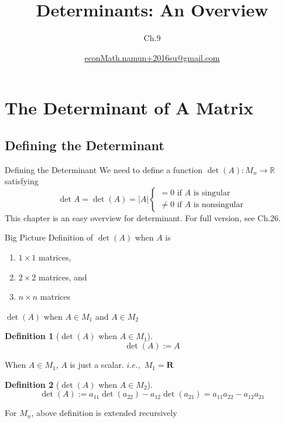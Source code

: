 \documentclass[final]{beamer}
\author[조남운]{\url{econMath.namun+2016su@gmail.com}}
\title{Determinants: An Overview}
\subtitle{Ch.9}
\newtheorem{defn}{Definition}
\begin{document}
	
\maketitle


\section{The Determinant of A Matrix} %
\label{sec:the_determinant_of_a_matrix}
\subsection{Defining the Determinant} %
\label{sub:defining_the_determinant}
\begin{frame}[t]{Defining the Determinant}
	We need to define a function $\det(A): M_n \rightarrow \mathbb{R}$ satisfying
	\[
		\det A = \det(A) = \vert A\vert \begin{cases}
			= 0 \text{ if $A$ is singular}\\
			\neq 0 \text{ if $A$ is nonsingular}
		\end{cases}
	\]
	This chapter is an easy overview for determinant. For full version, see Ch.26.
	\begin{block}
		{Big Picture}
		Definition of $\det(A)$ when $A$ is 
		\begin{enumerate}
			\item $1\times 1$ matrices,
			\item $2\times 2$ matrices, and
			\item $n\times n$ matrices
		\end{enumerate}
	\end{block}
\end{frame}
\begin{frame}[t]{$\det(A)$ when $A\in M_1$ and $A\in M_2$}
	\begin{defn}
		[$\det(A)$ when $A\in M_1$]
		\[
			\det(A):=A
		\]
	\end{defn}
	When $A\in M_1$, $A$ is just a scalar. $i.e.,$ $M_1 = \mathbf{R}$
	\begin{defn}
		[$\det(A)$ when $A\in M_2$]
		\[
			\det(A):= a_{11} \det(a_{22}) - a_{12}\det(a_{21}) =a_{11}a_{22}-a_{12}a_{21}
		\]
	\end{defn}
	For $M_n$, above definition is extended recursively
\end{frame}
\end{document}

